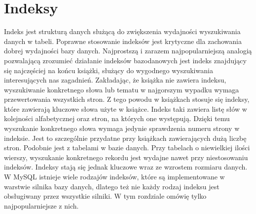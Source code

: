\section{Indeksy}
Indeks jest strukturą danych służącą do zwiększenia wydajności wyszukiwania danych w tabeli. Poprawne stosowanie indeksów jest krytyczne dla zachowania dobrej wydajności bazy danych.
Najprostszą i zarazem najpopularniejszą analogią pozwalającą zrozumieć działanie indeksów bazodanowych jest indeks znajdujący się najczęściej na końcu książki, służący do wygodnego wyszukiwania interesujących nas zagadnień. Zakładając, że książka nie zawiera indeksu, wyszukiwanie konkretnego słowa lub tematu w najgorszym wypadku wymaga przewertowania wszystkich stron. Z tego powodu w książkach stosuje się indeksy, które zawierają kluczowe słowa użyte w książce. Indeks taki zawiera listę słów w kolejności alfabetycznej oraz stron, na których one występują. Dzięki temu wyszukanie konkretnego słowa wymaga jedynie sprawdzenia numeru strony w indeksie. Jest to szczególnie przydatne przy książkach zawierających dużą liczbę stron. Podobnie jest z tabelami w bazie danych. Przy tabelach o niewielkiej ilości wierszy, wyszukanie konkretnego rekordu jest wydajne nawet przy niestosowaniu indeksów. Indeksy stają się jednak kluczowe wraz ze wzrostem rozmiaru danych.
W MySQL istnieje wiele rodzajów indeksów, które są implementowane w warstwie silnika bazy danych, dlatego też nie każdy rodzaj indeksu jest obsługiwany przez wszystkie silniki. W tym rozdziale omówię tylko najpopularniejsze z nich.



